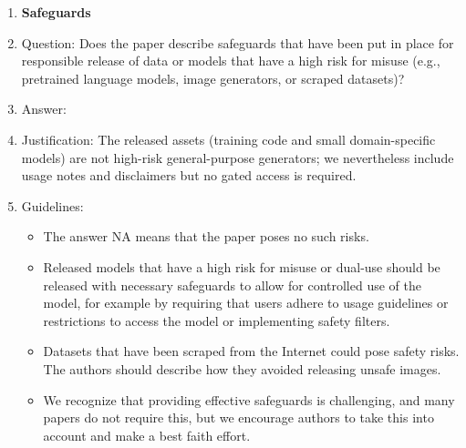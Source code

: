 \documentclass{article}
\begin{document}
\begin{enumerate}
\item {\bf Safeguards}
    \item[] Question: Does the paper describe safeguards that have been put in place for responsible release of data or models that have a high risk for misuse (e.g., pretrained language models, image generators, or scraped datasets)?
    \item[] Answer: \answerNA{}
    \item[] Justification: The released assets (training code and small domain-specific models) are not high-risk general-purpose generators; we nevertheless include usage notes and disclaimers but no gated access is required.
    \item[] Guidelines:
    \begin{itemize}
        \item The answer NA means that the paper poses no such risks.
        \item Released models that have a high risk for misuse or dual-use should be released with necessary safeguards to allow for controlled use of the model, for example by requiring that users adhere to usage guidelines or restrictions to access the model or implementing safety filters. 
        \item Datasets that have been scraped from the Internet could pose safety risks. The authors should describe how they avoided releasing unsafe images.
        \item We recognize that providing effective safeguards is challenging, and many papers do not require this, but we encourage authors to take this into account and make a best faith effort.
    \end{itemize}


\end{enumerate}
\end{document}
